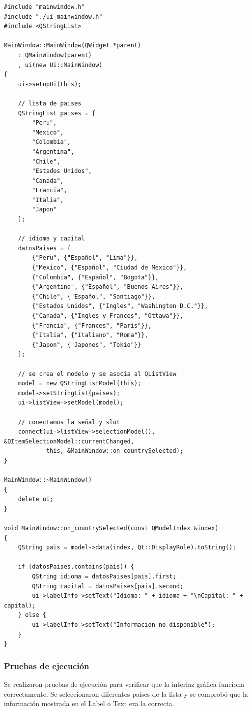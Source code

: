 \begin{lstlisting}[style=cpp-style, caption={mainwindow.cpp}]
#include "mainwindow.h"
#include "./ui_mainwindow.h"
#include <QStringList>

MainWindow::MainWindow(QWidget *parent)
    : QMainWindow(parent)
    , ui(new Ui::MainWindow)
{
    ui->setupUi(this);

    // lista de paises
    QStringList paises = {
        "Peru",
        "Mexico",
        "Colombia",
        "Argentina",
        "Chile",
        "Estados Unidos",
        "Canada",
        "Francia",
        "Italia",
        "Japon"
    };

    // idioma y capital
    datosPaises = {
        {"Peru", {"Español", "Lima"}},
        {"Mexico", {"Español", "Ciudad de Mexico"}},
        {"Colombia", {"Español", "Bogota"}},
        {"Argentina", {"Español", "Buenos Aires"}},
        {"Chile", {"Español", "Santiago"}},
        {"Estados Unidos", {"Ingles", "Washington D.C."}},
        {"Canada", {"Ingles y Frances", "Ottawa"}},
        {"Francia", {"Frances", "Paris"}},
        {"Italia", {"Italiano", "Roma"}},
        {"Japon", {"Japones", "Tokio"}}
    };

    // se crea el modelo y se asocia al QListView
    model = new QStringListModel(this);
    model->setStringList(paises);
    ui->listView->setModel(model);

    // conectamos la señal y slot
    connect(ui->listView->selectionModel(), &QItemSelectionModel::currentChanged,
            this, &MainWindow::on_countrySelected);
}

MainWindow::~MainWindow()
{
    delete ui;
}

void MainWindow::on_countrySelected(const QModelIndex &index)
{
    QString pais = model->data(index, Qt::DisplayRole).toString();

    if (datosPaises.contains(pais)) {
        QString idioma = datosPaises[pais].first;
        QString capital = datosPaises[pais].second;
        ui->labelInfo->setText("Idioma: " + idioma + "\nCapital: " + capital);
    } else {
        ui->labelInfo->setText("Informacion no disponible");
    }
}
\end{lstlisting}

\subsubsection{Pruebas de ejecución}

Se realizaron pruebas de ejecución para verificar que la interfaz gráfica funciona correctamente. Se seleccionaron diferentes países de la lista y se comprobó que la información mostrada en el Label o Text era la correcta.

